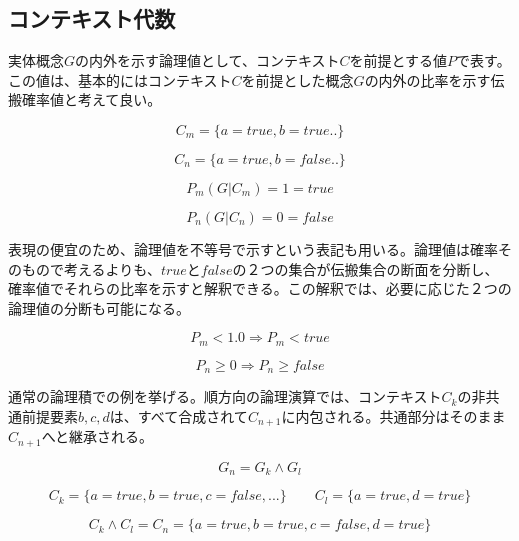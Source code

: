 \documentclass[12pt]{article}
\begin{document}
\subsection{コンテキスト代数}\label{ux30b3ux30f3ux30c6ux30adux30b9ux30c8ux4ee3ux6570}

実体概念\(G\)の内外を示す論理値として、コンテキスト\(C\)を前提とする値\(P\)で表す。この値は、基本的にはコンテキスト\(C\)を前提とした概念\(G\)の内外の比率を示す伝搬確率値と考えて良い。

\begin{equation}C_m=\{a=true,b=true..\}\end{equation}

\begin{equation}C_n=\{a=true,b=false..\}\end{equation}

\begin{equation}  P_m(G|C_m)=1 = true \end{equation}

\begin{equation}  P_n(G|C_n)=0 =false\end{equation}

表現の便宜のため、論理値を不等号で示すという表記も用いる。論理値は確率そのもので考えるよりも、\(true\)と\(false\)の２つの集合が伝搬集合の断面を分断し、確率値でそれらの比率を示すと解釈できる。この解釈では、必要に応じた２つの論理値の分断も可能になる。

\begin{equation} P_m < 1.0 \Rightarrow P_m <true \end{equation}

\begin{equation} P_n \ge 0  \Rightarrow P_n \ge false  \end{equation}

通常の論理積での例を挙げる。順方向の論理演算では、コンテキスト\(C_{k}\)の非共通前提要素\(b,c,d\)は、すべて合成されて\(C_{n+1}\)に内包される。共通部分はそのまま\(C_{n+1}\)へと継承される。

\begin{equation} G_{n} = G_{k} \wedge G_{l}\end{equation}

\begin{equation} C_{k}=\{a=true,b=true,c=false,...\} \qquad  C_{l}=\{a=true,d=true\} \end{equation}

\begin{equation}C_{k} \wedge C_{l} = C_{n}=\{a=true,b=true,c=false,d=true\} \end{equation}
\end{document}
